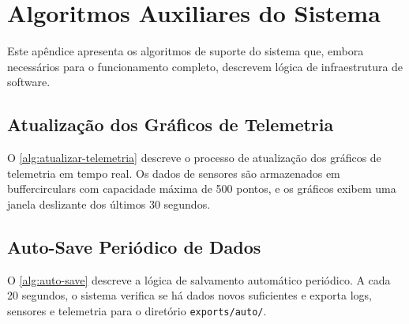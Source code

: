 \chapter{Algoritmos Auxiliares do Sistema}
\label{apendice:algoritmos-auxiliares}

Este apêndice apresenta os algoritmos de suporte do sistema que, embora necessários para o funcionamento completo, descrevem lógica de infraestrutura de software.

\section*{Atualização dos Gráficos de Telemetria}

O \autoref{alg:atualizar-telemetria} descreve o processo de atualização dos gráficos de telemetria em tempo real. Os dados de sensores são armazenados em \glspl{buffercircular} com capacidade máxima de 500 pontos, e os gráficos exibem uma janela deslizante dos últimos 30 segundos.

\begin{algorithm}[h!]
	\SetSpacedAlgorithm
	\caption{\label{alg:atualizar-telemetria}Atualização dos gráficos de telemetria}
\end{algorithm}

\section*{Auto-Save Periódico de Dados}

O \autoref{alg:auto-save} descreve a lógica de salvamento automático periódico. A cada 20 segundos, o sistema verifica se há dados novos suficientes e exporta logs, sensores e telemetria para o diretório \texttt{exports/auto/}.

